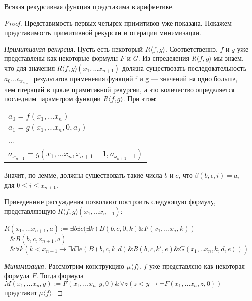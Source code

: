 \begin{theorem}Всякая рекурсивная функция представима в арифметике.\end{theorem}
\begin{proof}
Представимость первых четырех примитивов уже показана. Покажем представимость примитивной рекурсии и 
операции минимизации.

\emph{Примитивная рекурсия.} Пусть есть некоторый $R \langle{} f,g \rangle$. Соответственно, $f$ и $g$ уже 
представлены как некоторые формулы $F$ и $G$. Из определения $R\langle{}f,g\rangle$ мы знаем,
что для значения $R \langle{} f,g \rangle (x_1,...x_{n+1})$ должна существовать последовательность
$a_0 ... a_{x_{n+1}}$ результатов применения функций f и g --- значений на одно больше, чем 
итераций в цикле примитивной рекурсии,
а это количество определяется последним параметром функции $R \langle{}f,g\rangle$. При этом:

\begin{tabular}{l}
$a_0 = f(x_1, \dots x_n)$\\
$a_1 = g(x_1, \dots x_n,0,a_0)$\\
...\\
$a_{x_{n+1}} = g(x_1, \dots x_n, x_{n+1}-1,a_{x_{n+1}-1})$
\end{tabular}

Значит, по лемме, должны существовать такие числа $b$ и $c$, что
$\beta (b,c,i) = a_i$ для $0 \le i \le x_{n+1}$.

Приведенные рассуждения позволяют построить следующую формулу, представляющую $R\langle{}f,g\rangle (x_1, ... x_{n+1})$:

\begin{center}
$R(x_1, \dots x_{n+1}, a) := \exists b \exists c (\exists k (B (b,c,0,k) \& F (x_1,...x_n, k))$\\
       $\;\;\;\& B (b,c,x_{n+1},a)$\\
       $\;\;\;\& \forall k (k < x_{n+1} \rightarrow \exists d \exists e (B (b,c,k,d) \& B (b,c,k',e) \&
           G (x_1,..x_n,k,d,e)))$
\end{center}

\emph{Минимизация.} Рассмотрим конструкцию $\mu\langle{}f\rangle$. $f$ уже представлено 
как некоторая формула $F$. Тогда формула 
$M (x_1, \dots x_n,y) := F(x_1, \dots x_n,y,0) \& \forall z (z < y \rightarrow \neg F (x_1, \dots x_n,z,0))$
представит $\mu\langle{}f\rangle$.

\end{proof}
